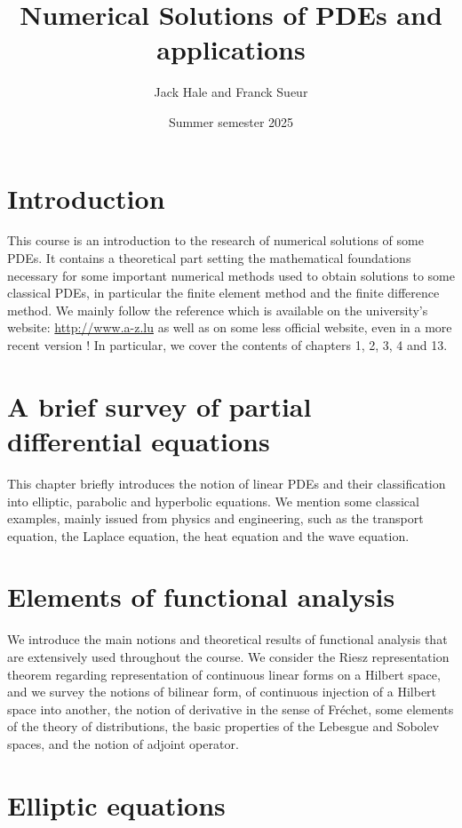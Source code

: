 \documentclass{article}
\title{Numerical Solutions of PDEs and applications}
\author{Jack Hale and Franck Sueur}
\date{Summer semester 2025}
\begin{document}
\maketitle

\section{Introduction}

This course is an introduction to the research of numerical solutions of some
PDEs. It contains a theoretical part setting the mathematical foundations
necessary for some important numerical methods used to obtain solutions to some
classical PDEs, in particular the finite element method and the finite
difference method. We mainly follow the reference \cite{Q} which is available
on the university's website:  \url{http://www.a-z.lu} as well as on some less
official website, even in a more recent version ! In particular, we cover the
contents of chapters 1, 2, 3, 4 and 13.

\section{A brief survey of partial differential equations}

This chapter briefly introduces the notion of linear PDEs and their
classification into elliptic, parabolic and hyperbolic  equations. We mention
some classical examples, mainly issued from physics and engineering, such as
the transport equation, the Laplace equation, the heat equation and the wave
equation. 

\section{Elements of functional analysis} 

We introduce the main notions and theoretical results of functional analysis
that are extensively used throughout the course. We consider the Riesz
representation theorem regarding representation of continuous linear forms on a
Hilbert space, and we survey the notions of bilinear form, of continuous
injection of a Hilbert space into another, the notion of derivative in the
sense of Fréchet, some elements of the theory of distributions, the basic
properties of the Lebesgue and Sobolev spaces, and the notion of adjoint
operator. 

\section{Elliptic equations}
\end{document}
